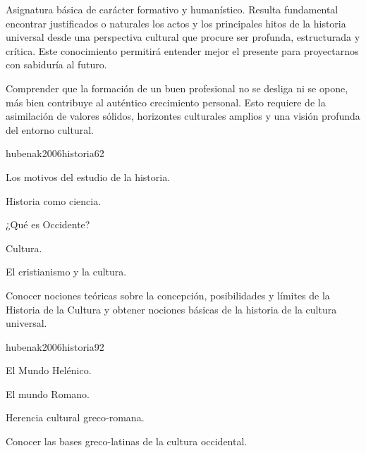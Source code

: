 \begin{syllabus}


\begin{justification}
Asignatura básica de carácter formativo y humanístico. Resulta fundamental encontrar justificados o naturales los actos y los principales hitos de la historia universal desde una perspectiva cultural que procure ser profunda, estructurada y crítica. Este conocimiento permitirá entender mejor el presente para proyectarnos con sabiduría al futuro.
\end{justification}

\begin{goals}
\item Comprender que la formación de un buen profesional no se desliga ni se opone, más bien contribuye al auténtico crecimiento personal. Esto requiere de la asimilación de valores sólidos, horizontes culturales amplios y una visión profunda del entorno cultural.
\end{goals}

\begin{outcomes}
\end{outcomes}

\begin{unit}{}{hubenak2006historia}{6}{2}
\begin{topics}
	\item Los motivos del estudio de la historia. 	
	\item Historia como ciencia. 	
	\item ¿Qué es Occidente? 	
	\item Cultura. 	
	\item El cristianismo y la cultura. 
\end{topics}
\begin{learningoutcomes}
	\item Conocer nociones teóricas sobre la concepción, posibilidades y límites de la Historia de la Cultura y obtener nociones básicas de la historia de la cultura universal.
\end{learningoutcomes}
\end{unit}

\begin{unit}{}{hubenak2006historia}{9}{2}
\begin{topics}
	\item El Mundo Helénico. 	
	\item El mundo Romano. 	
	\item Herencia cultural greco-romana. 
\end{topics}
\begin{learningoutcomes}
	\item Conocer las bases greco-latinas de la cultura occidental.
\end{learningoutcomes}
\end{unit}


\end{syllabus}
